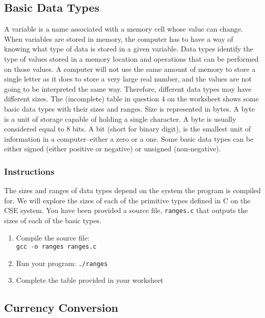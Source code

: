 \documentclass[12pt]{scrartcl}
\begin{document}
\subsection{Basic Data Types}

A variable is a name associated with a memory cell whose value can change. 
When variables are stored in memory, the computer has to have a way of 
knowing what type of data is stored in a given variable.  Data types identify 
the type of values stored in a memory location and operations that can be 
performed on those values.  A computer will not use the same amount of 
memory to store a single letter as it does to store a very large real number, 
and the values are not going to be interpreted the same way.  Therefore, 
different data types may have different sizes. The (incomplete) table in 
question 4 on the worksheet shows some basic data types with their 
sizes and ranges.  Size is represented in bytes.  A byte is a unit of storage 
capable of holding a single character.  A byte is usually considered equal 
to 8 bits.  A bit (short for binary digit), is the smallest unit of information in 
a computer--either a zero or a one.  Some basic data types can be either 
signed (either positive or negative) or unsigned (non-negative).

\subsubsection*{Instructions}

The sizes and ranges of data types depend on the system the program is 
compiled for.  We will explore the sizes of each of the primitive types defined 
in C on the CSE system.  You have been provided a source file, 
\texttt{ranges.c} that outputs the sizes of each of the basic types.

\begin{enumerate}
  \item Compile the source file:\\
  	\texttt{gcc -o ranges ranges.c}
  \item Run your program:
  	\texttt{./ranges}
  \item Complete the table provided in your worksheet
 \end{enumerate}
 
\subsection{Currency Conversion}
\end{document}
